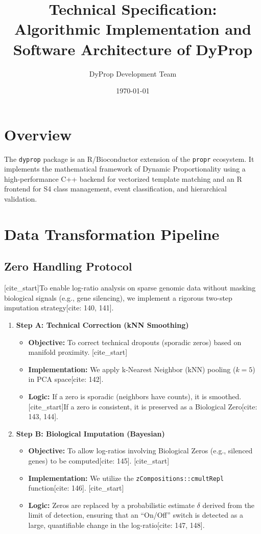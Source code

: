\documentclass[11pt, a4paper]{article}
\title{\textbf{Technical Specification: Algorithmic Implementation and Software Architecture of DyProp}}
\author{DyProp Development Team}
\date{\today}
\begin{document}
\maketitle

\section{Overview}
The \texttt{dyprop} package is an R/Bioconductor extension of the \texttt{propr} ecosystem. It implements the mathematical framework of Dynamic Proportionality using a high-performance C++ backend for vectorized template matching and an R frontend for S4 class management, event classification, and hierarchical validation.

\section{Data Transformation Pipeline}

\subsection{Zero Handling Protocol}
[cite_start]To enable log-ratio analysis on sparse genomic data without masking biological signals (e.g., gene silencing), we implement a rigorous two-step imputation strategy[cite: 140, 141].
\begin{enumerate}
    \item \textbf{Step A: Technical Correction (kNN Smoothing)}
    \begin{itemize}
        \item \textbf{Objective:} To correct technical dropouts (sporadic zeros) based on manifold proximity.
        [cite_start]\item \textbf{Implementation:} We apply k-Nearest Neighbor (kNN) pooling ($k=5$) in PCA space[cite: 142].
        \item \textbf{Logic:} If a zero is sporadic (neighbors have counts), it is smoothed. [cite_start]If a zero is consistent, it is preserved as a Biological Zero[cite: 143, 144].
    \end{itemize}
    
    \item \textbf{Step B: Biological Imputation (Bayesian)}
    \begin{itemize}
        [cite_start]\item \textbf{Objective:} To allow log-ratios involving Biological Zeros (e.g., silenced genes) to be computed[cite: 145].
        [cite_start]\item \textbf{Implementation:} We utilize the \texttt{zCompositions::cmultRepl} function[cite: 146].
        [cite_start]\item \textbf{Logic:} Zeros are replaced by a probabilistic estimate $\delta$ derived from the limit of detection, ensuring that an ``On/Off'' switch is detected as a large, quantifiable change in the log-ratio[cite: 147, 148].
    \end{itemize}
\end{enumerate}
\end{document}
